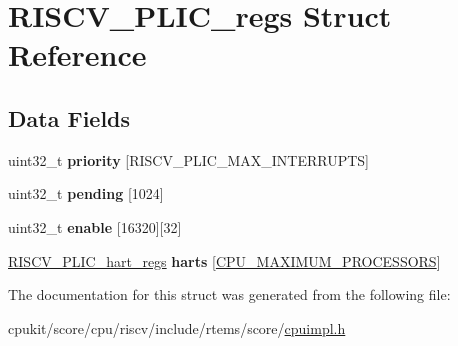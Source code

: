 \hypertarget{structRISCV__PLIC__regs}{}\section{R\+I\+S\+C\+V\+\_\+\+P\+L\+I\+C\+\_\+regs Struct Reference}
\label{structRISCV__PLIC__regs}
\subsection*{Data Fields}
\begin{DoxyCompactItemize}
\item 
\mbox{\label{structRISCV__PLIC__regs_a83f6af20f2b5dda1f20d82594ed41610}} 
uint32\+\_\+t {\bfseries priority} \mbox{[}R\+I\+S\+C\+V\+\_\+\+P\+L\+I\+C\+\_\+\+M\+A\+X\+\_\+\+I\+N\+T\+E\+R\+R\+U\+P\+TS\mbox{]}
\item 
\mbox{\label{structRISCV__PLIC__regs_a5757b9a3ebd481c652d6c251f9432600}} 
uint32\+\_\+t {\bfseries pending} \mbox{[}1024\mbox{]}
\item 
\mbox{\label{structRISCV__PLIC__regs_a13af53348fa7d703e3b7fba37cc99d9e}} 
uint32\+\_\+t {\bfseries enable} \mbox{[}16320\mbox{]}\mbox{[}32\mbox{]}
\item 
\mbox{\label{structRISCV__PLIC__regs_a0db9ccffdd3f569ac86786274ea5501b}} 
\mbox{\hyperlink{structRISCV__PLIC__hart__regs}{R\+I\+S\+C\+V\+\_\+\+P\+L\+I\+C\+\_\+hart\+\_\+regs}} {\bfseries harts} \mbox{[}\mbox{\hyperlink{no__cpu_2include_2rtems_2score_2cpu_8h_adea68a7fa02909edcebee08748f94223}{C\+P\+U\+\_\+\+M\+A\+X\+I\+M\+U\+M\+\_\+\+P\+R\+O\+C\+E\+S\+S\+O\+RS}}\mbox{]}
\end{DoxyCompactItemize}


The documentation for this struct was generated from the following file\+:\begin{DoxyCompactItemize}
\item 
cpukit/score/cpu/riscv/include/rtems/score/\mbox{\hyperlink{riscv_2include_2rtems_2score_2cpuimpl_8h}{cpuimpl.\+h}}\end{DoxyCompactItemize}
